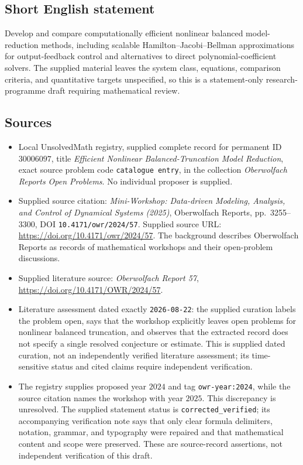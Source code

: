 \documentclass[11pt]{article}
\begin{document}
\subsection{Short English statement}
Develop and compare computationally efficient nonlinear balanced model-reduction methods, including scalable Hamilton--Jacobi--Bellman approximations for output-feedback control and alternatives to direct polynomial-coefficient solvers. The supplied material leaves the system class, equations, comparison criteria, and quantitative targets unspecified, so this is a statement-only research-programme draft requiring mathematical review.
\subsection{Sources}
\begin{itemize}
\item Local UnsolvedMath registry, supplied complete record for permanent ID \(30006097\), title \emph{Efficient Nonlinear Balanced-Truncation Model Reduction}, exact source problem code \texttt{catalogue entry}, in the collection \emph{Oberwolfach Reports Open Problems}. No individual proposer is supplied.
\item Supplied source citation: \emph{Mini-Workshop: Data-driven Modeling, Analysis, and Control of Dynamical Systems (2025)}, Oberwolfach Reports, pp.\ 3255--3300, DOI \texttt{10.4171/owr/2024/57}. Supplied source URL: \url{https://doi.org/10.4171/owr/2024/57}. The background describes Oberwolfach Reports as records of mathematical workshops and their open-problem discussions.
\item Supplied literature source: \emph{Oberwolfach Report 57}, \url{https://doi.org/10.4171/OWR/2024/57}.
\item Literature assessment dated exactly \texttt{2026-08-22}: the supplied curation labels the problem open, says that the workshop explicitly leaves open problems for nonlinear balanced truncation, and observes that the extracted record does not specify a single resolved conjecture or estimate. This is supplied dated curation, not an independently verified literature assessment; its time-sensitive status and cited claims require independent verification.
\item The registry supplies proposed year \(2024\) and tag \texttt{owr-year:2024}, while the source citation names the workshop with year \(2025\). This discrepancy is unresolved. The supplied statement status is \texttt{corrected\_verified}; its accompanying verification note says that only clear formula delimiters, notation, grammar, and typography were repaired and that mathematical content and scope were preserved. These are source-record assertions, not independent verification of this draft.
\end{itemize}
\end{document}
